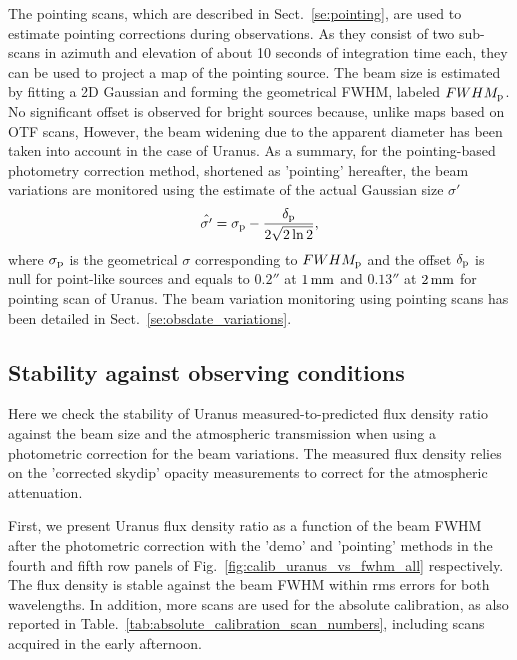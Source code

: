 The pointing scans, which are described in Sect.~\ref{se:pointing},
are used to estimate pointing corrections during observations. As they
consist of two sub-scans in azimuth and elevation of about 10 seconds
of integration time each, they can be used to project a map of the
pointing source. The beam size is estimated by fitting a 2D Gaussian
and forming the geometrical FWHM, labeled $FWHM_{\rm{p}}$. No
significant offset is observed for bright sources because, unlike maps
based on OTF scans, 
However, the beam widening due to the apparent diameter has been taken
into account in the case of Uranus.
As a summary, for the pointing-based photometry correction method,
shortened as 'pointing' hereafter, the
beam variations are monitored using the estimate of the
actual Gaussian size $\sigma '$ 
\begin{equation}
  \hat{\sigma '} = \sigma_{\rm{p}} - \frac{\delta_{\rm{p}}}{2\sqrt{2 \ln{2}}}, 
\end{equation} 
where $\sigma_{\rm{p}}$ is the geometrical $\sigma$ corresponding to
$FWHM_{\rm{p}}$ and the offset $\delta_{\rm{p}}$ is null for
point-like sources and equals to $0.2''$ at $1\,\rm{mm}$ and $0.13''$
at $2\,\rm{mm}$
for pointing scan of Uranus. The beam variation monitoring using
pointing scans has been detailed in
Sect.~\ref{se:obsdate_variations}.



\subsection{Stability against observing conditions}

Here we check the stability of Uranus measured-to-predicted flux
density ratio against the beam size and the atmospheric transmission
when using a photometric correction for the beam variations.
The measured flux density relies on the 'corrected skydip' opacity
measurements to correct for the atmospheric attenuation.  

First, we present Uranus flux density ratio as a function of the beam FWHM
after the photometric correction with the 'demo' and 'pointing'
methods in the fourth and fifth row panels of
Fig.~\ref{fig:calib_uranus_vs_fwhm_all} respectively. The flux density
is stable against the beam FWHM within rms errors for both
wavelengths. In addition, more scans are used for the absolute
calibration, as also reported in
Table.~\ref{tab:absolute_calibration_scan_numbers}, including scans
acquired in the early afternoon.

